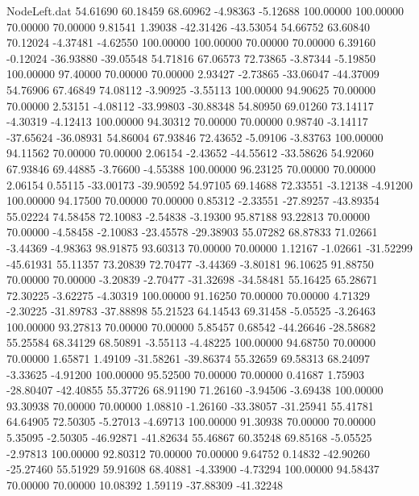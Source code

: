 \begin{filecontents}{NodeLeft.dat}
  54.61690   60.18459   68.60962    -4.98363   -5.12688  100.00000  100.00000   70.00000   70.00000    9.81541    1.39038  -42.31426  -43.53054
  54.66752   63.60840   70.12024    -4.37481   -4.62550  100.00000  100.00000   70.00000   70.00000    6.39160   -0.12024  -36.93880  -39.05548
  54.71816   67.06573   72.73865    -3.87344   -5.19850  100.00000   97.40000   70.00000   70.00000    2.93427   -2.73865  -33.06047  -44.37009
  54.76906   67.46849   74.08112    -3.90925   -3.55113  100.00000   94.90625   70.00000   70.00000    2.53151   -4.08112  -33.99803  -30.88348
  54.80950   69.01260   73.14117    -4.30319   -4.12413  100.00000   94.30312   70.00000   70.00000    0.98740   -3.14117  -37.65624  -36.08931
  54.86004   67.93846   72.43652    -5.09106   -3.83763  100.00000   94.11562   70.00000   70.00000    2.06154   -2.43652  -44.55612  -33.58626
  54.92060   67.93846   69.44885    -3.76600   -4.55388  100.00000   96.23125   70.00000   70.00000    2.06154    0.55115  -33.00173  -39.90592
  54.97105   69.14688   72.33551    -3.12138   -4.91200  100.00000   94.17500   70.00000   70.00000    0.85312   -2.33551  -27.89257  -43.89354
  55.02224   74.58458   72.10083    -2.54838   -3.19300   95.87188   93.22813   70.00000   70.00000   -4.58458   -2.10083  -23.45578  -29.38903
  55.07282   68.87833   71.02661    -3.44369   -4.98363   98.91875   93.60313   70.00000   70.00000    1.12167   -1.02661  -31.52299  -45.61931
  55.11357   73.20839   72.70477    -3.44369   -3.80181   96.10625   91.88750   70.00000   70.00000   -3.20839   -2.70477  -31.32698  -34.58481
  55.16425   65.28671   72.30225    -3.62275   -4.30319  100.00000   91.16250   70.00000   70.00000    4.71329   -2.30225  -31.89783  -37.88898
  55.21523   64.14543   69.31458    -5.05525   -3.26463  100.00000   93.27813   70.00000   70.00000    5.85457    0.68542  -44.26646  -28.58682
  55.25584   68.34129   68.50891    -3.55113   -4.48225  100.00000   94.68750   70.00000   70.00000    1.65871    1.49109  -31.58261  -39.86374
  55.32659   69.58313   68.24097    -3.33625   -4.91200  100.00000   95.52500   70.00000   70.00000    0.41687    1.75903  -28.80407  -42.40855
  55.37726   68.91190   71.26160    -3.94506   -3.69438  100.00000   93.30938   70.00000   70.00000    1.08810   -1.26160  -33.38057  -31.25941
  55.41781   64.64905   72.50305    -5.27013   -4.69713  100.00000   91.30938   70.00000   70.00000    5.35095   -2.50305  -46.92871  -41.82634
  55.46867   60.35248   69.85168    -5.05525   -2.97813  100.00000   92.80312   70.00000   70.00000    9.64752    0.14832  -42.90260  -25.27460
  55.51929   59.91608   68.40881    -4.33900   -4.73294  100.00000   94.58437   70.00000   70.00000   10.08392    1.59119  -37.88309  -41.32248

\end{filecontents}
